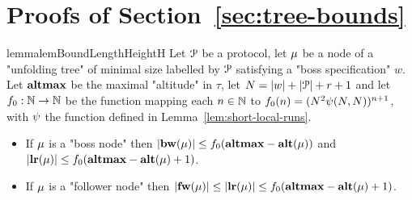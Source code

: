 \section{Proofs of Section~\ref{sec:tree-bounds}}

\begin{restatable}{lemma}{lemBoundLengthHeightH}
	\label{lem:bound-length-at-height-h}
	Let $\mathcal{P}$ be a protocol, let $\mu$ be a node of a "unfolding tree" of minimal size labelled by $\mathcal{P}$ satisfying a "boss specification" $w$.
	Let $\mathbf{altmax}$ be the maximal "altitude" in $\tau$, let $N = |w| + |\mathcal{P}| +r +1$ and let $f_0 : \mathbb{N} \to \mathbb{N}$ be the function mapping each $n \in \mathbb{N}$ to $f_0(n)=(N^2 \psi(N,N))^{n+1}$, with $\psi$ the function defined in Lemma~\ref{lem:short-local-runs}.
	
	\begin{itemize}
		\item If $\mu$ is a "boss node" then $|\mathbf{bw}(\mu)| \leq f_0(\mathbf{altmax} - \mathbf{alt}(\mu))$ and $|\mathbf{lr}(\mu)| \leq f_0(\mathbf{altmax} - \mathbf{alt}(\mu)+1)$.
		
		\item If $\mu$ is a "follower node" then $|\mathbf{fw}(\mu)| \leq |\mathbf{lr}(\mu)| \leq f_0(\mathbf{altmax} - \mathbf{alt}(\mu)+1)$.
	\end{itemize} 
\end{restatable}

